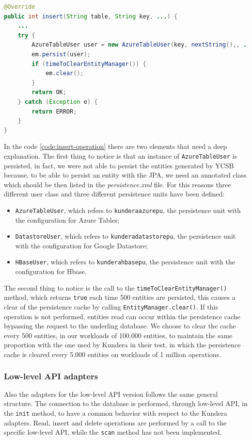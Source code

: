 \begin{lstlisting}[language=Java, caption=Insert operation of the Azure Tables adapter, label=code:insert-operation]
@Override
public int insert(String table, String key, ...) {
    ...
    try {
        AzureTableUser user = new AzureTableUser(key, nextString(),, ...);
        em.persist(user);
        if (timeToClearEntityManager()) {
            em.clear();
        }
        return OK;
    } catch (Exception e) {
        return ERROR;
    }
}
\end{lstlisting}

\noindent In the code \ref{code:insert-operation} there are two elements that need a deep explanation. The first thing to notice is that an instance of \texttt{AzureTableUser} is persisted, in fact, we were not able to persist the entities generated by YCSB because, to be able to persist an entity with the JPA, we need an annotated class which should be then listed in the \textit{persistence.xml} file. For this reasons three different user class and three different persistence units have been defined:
\begin{itemize}
\item \texttt{AzureTableUser}, which refers to \texttt{kundera\textunderscore azure\textunderscore pu}, the persistence unit with the configuration for Azure Tables;
\item \texttt{DatastoreUser}, which refers to \texttt{kundera\textunderscore datastore\textunderscore pu}, the persistence unit with the configuration for Google Datastore;
\item \texttt{HBaseUser}, which refers to \texttt{kundera\textunderscore hbase\textunderscore pu}, the persistence unit with the configuration for Hbase.
\end{itemize} 
\noindent The second thing to notice is the call to the \texttt{timeToClearEntityManager()} method, which returns \texttt{true} each time 500 entities are persisted, this causes a clear of the persistence cache by calling \texttt{EntityManager.clear()}. If this operation is not performed, entities read can occur within the persistence cache bypassing the request to the underling database. We choose to clear the cache every 500 entities, in our workloads of 100.000 entities, to maintain the same proportion with the one used by Kundera in their test, in which the persistence cache is cleared every 5.000 entities on workloads of 1 million operations.

\subsubsection{Low-level API adapters}
Also the adapters for the low-level API version follows the same general structure. The connection to the database is performed, through low-level API, in the \texttt{init} method, to have a common behavior with respect to the Kundera adapters. Read, insert and delete operations are performed by a call to the specific low-level API, while the \texttt{scan} method has not been implemented.

